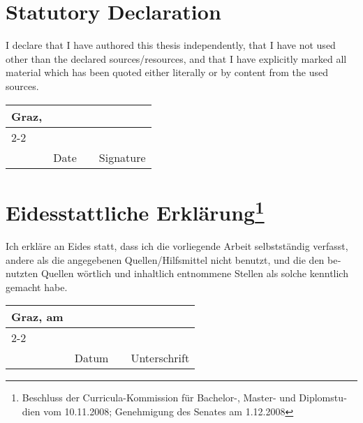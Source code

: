
\section*{Statutory Declaration}

I declare that I have authored this thesis independently, that I have
not used other than the declared sources/resources, and that I have
explicitly marked all material which has been quoted either literally
or by content from the used sources.

\vfill

\newcommand{\mysignatureblock}[3]{%
  \begin{tabular}{llp{2em}l} 
  #1 & \hspace{5cm}        & & \hspace{6cm} \\\cline{2-2}\cline{4-4}
     &                     & & \\[-3mm]
     & {\footnotesize #2}  & & {\footnotesize #3}
  \end{tabular}
}

\mysignatureblock{Graz,}{Date}{Signature}

\vfill
\vfill
\vfill
\vfill

\section*{Eidesstattliche Erklärung\footnote{%
\foreignlanguage{ngerman}{Beschluss der Curricula-Kommission für Bachelor-, Master- und 
Diplomstudien vom 10.11.2008; 
Genehmigung des Senates am 1.12.2008}}}

\foreignlanguage{ngerman}{%
Ich erkläre an Eides statt, dass ich die
vorliegende Arbeit selbstständig verfasst, andere als die angegebenen
Quellen/Hilfsmittel nicht benutzt, und die den benutzten Quellen
wörtlich und inhaltlich entnommene Stellen als solche kenntlich
gemacht habe.}

\vfill

\mysignatureblock{Graz, am}{Datum}{Unterschrift}


\newpage
\newpage

